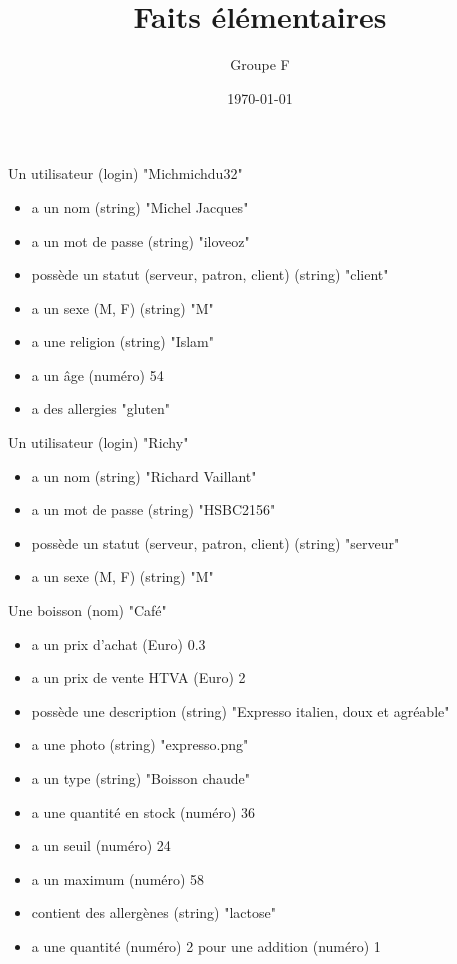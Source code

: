 \documentclass[10pt, a4, oneside, headings=normal]{scrartcl}
\begin{document}
\titlehead{}
\subject{}
\title{Faits élémentaires}
\subtitle{ }
\author{Groupe F}
\publishers{}
\date{\today}

\dedication{}

\maketitle

Un utilisateur (login) "Michmichdu32"
\begin{itemize}
\item a un nom (string) "Michel Jacques"
\item a un mot de passe (string) "iloveoz"
\item possède un statut (serveur, patron, client) (string) "client"
\item a un sexe (M, F) (string) "M"
\item a une religion (string) "Islam"
\item a un âge (numéro) 54
\item a des allergies "gluten"
\end{itemize}

Un utilisateur (login) "Richy"
\begin{itemize}
\item a un nom (string) "Richard Vaillant"
\item a un mot de passe (string) "HSBC2156"
\item possède un statut (serveur, patron, client) (string) "serveur"
\item a un sexe (M, F) (string) "M"
\end{itemize}

Une boisson (nom) "Café"
\begin{itemize}
\item a un prix d'achat (Euro) 0.3
\item a un prix de vente HTVA (Euro) 2
\item possède une description (string) "Expresso italien, doux et agréable"
\item a une photo (string) "expresso.png"
\item a un type (string) "Boisson chaude"
\item a une quantité en stock (numéro) 36
\item a un seuil (numéro) 24
\item a un maximum (numéro) 58
\item contient des allergènes (string) "lactose"
\item a une quantité (numéro) 2 pour une addition (numéro) 1
\end{itemize}
\end{document}
